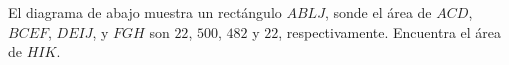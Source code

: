 El diagrama de abajo muestra un rectángulo $ABLJ$, sonde el área de $ACD$, $BCEF$, $DEIJ$, y $FGH$ son $22$, $500$, $482$ y $22$, respectivamente. Encuentra el área de $HIK$.